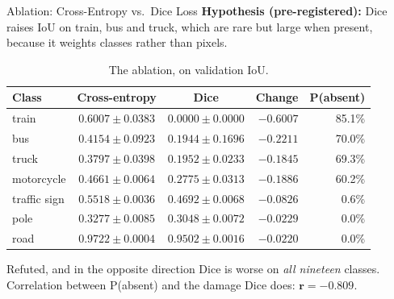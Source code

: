 \begin{frame}{Ablation: Cross-Entropy vs.\ Dice Loss}
\small
\textbf{Hypothesis (pre-registered):} Dice raises IoU on train, bus and truck, which are
rare but large when present, because it weights classes rather than pixels.

\begin{table}
\centering
\scriptsize
\caption{The ablation, on validation IoU.}
\begin{tabular}{lccrr}
\toprule
\textbf{Class} & \textbf{Cross-entropy} & \textbf{Dice} & \textbf{Change} & \textbf{P(absent)} \\
\midrule
train        & $0.6007 \pm 0.0383$ & $\mathbf{0.0000 \pm 0.0000}$ & $-0.6007$ & 85.1\% \\
bus          & $0.4154 \pm 0.0923$ & $0.1944 \pm 0.1696$ & $-0.2211$ & 70.0\% \\
truck        & $0.3797 \pm 0.0398$ & $0.1952 \pm 0.0233$ & $-0.1845$ & 69.3\% \\
motorcycle   & $0.4661 \pm 0.0064$ & $0.2775 \pm 0.0313$ & $-0.1886$ & 60.2\% \\
\midrule
traffic sign & $0.5518 \pm 0.0036$ & $0.4692 \pm 0.0068$ & $-0.0826$ &  0.6\% \\
pole         & $0.3277 \pm 0.0085$ & $0.3048 \pm 0.0072$ & $-0.0229$ &  0.0\% \\
road         & $0.9722 \pm 0.0004$ & $0.9502 \pm 0.0016$ & $-0.0220$ &  0.0\% \\
\bottomrule
\end{tabular}
\end{table}

\vspace{-0.1cm}
\begin{alertblock}{Refuted, and in the opposite direction}
Dice is worse on \emph{all nineteen} classes. Correlation between P(absent) and the damage Dice
does: $\mathbf{r = -0.809}$.
\end{alertblock}
\end{frame}

